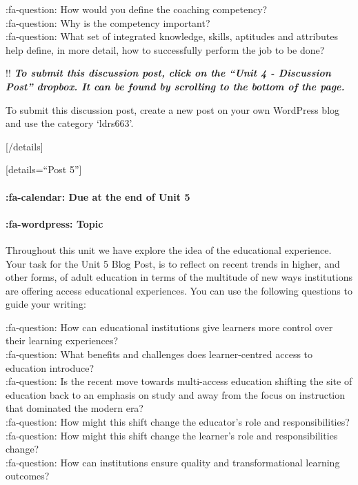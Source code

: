 \documentclass[
]{book}
\begin{document}
:fa-question: How would you define the coaching competency?\\
:fa-question: Why is the competency important?\\
:fa-question: What set of integrated knowledge, skills, aptitudes and attributes help define, in more detail, how to successfully perform the job to be done?

!! \textbf{\emph{To submit this discussion post, click on the ``Unit 4 - Discussion Post'' dropbox. It can be found by scrolling to the bottom of the page.}}

To submit this discussion post, create a new post on your own WordPress blog and use the category `ldrs663'.

{[}/details{]}

{[}details=``Post 5''{]}

\hypertarget{fa-calendar-due-at-the-end-of-unit-5}{%
\paragraph{:fa-calendar: Due at the end of Unit 5}\label{fa-calendar-due-at-the-end-of-unit-5}}

\hypertarget{fa-wordpress-topic-3}{%
\paragraph{:fa-wordpress: Topic}\label{fa-wordpress-topic-3}}

Throughout this unit we have explore the idea of the educational experience. Your task for the Unit 5 Blog Post, is to reflect on recent trends in higher, and other forms, of adult education in terms of the multitude of new ways institutions are offering access educational experiences. You can use the following questions to guide your writing:

:fa-question: How can educational institutions give learners more control over their learning experiences?\\
:fa-question: What benefits and challenges does learner-centred access to education introduce?\\
:fa-question: Is the recent move towards multi-access education shifting the site of education back to an emphasis on study and away from the focus on instruction that dominated the modern era?\\
:fa-question: How might this shift change the educator's role and responsibilities?\\
:fa-question: How might this shift change the learner's role and responsibilities change?\\
:fa-question: How can institutions ensure quality and transformational learning outcomes?
\end{document}
